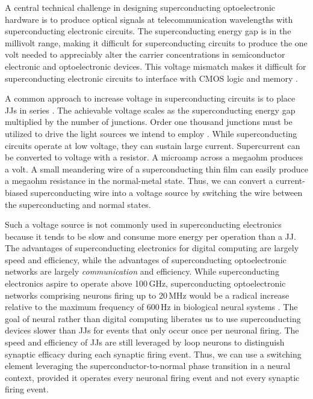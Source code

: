 \documentclass[twocolumn]{article}
\begin{document}
A central technical challenge in designing superconducting optoelectronic hardware is to produce optical signals at telecommunication wavelengths with superconducting electronic circuits. The superconducting energy gap \cite{ti1996} is in the millivolt range, making it difficult for superconducting circuits to produce the one volt needed to appreciably alter the carrier concentrations in semiconductor electronic and optoelectronic devices. This voltage mismatch makes it difficult for superconducting electronic circuits to interface with CMOS logic \cite{ka1999} and memory \cite{vafe2002}. 

A common approach to increase voltage in superconducting circuits is to place JJs in series \cite{suin1988}. The achievable voltage scales as the superconducting energy gap multiplied by the number of junctions. Order one thousand junctions must be utilized to drive the light sources we intend to employ \cite{shbu2017,buch2017,bu2018}. While superconducting circuits operate at low voltage, they can sustain large current. Supercurrent can be converted to voltage with a resistor. A microamp across a megaohm produces a volt. A small meandering wire of a superconducting thin film can easily produce a megaohm resistance in the normal-metal state. Thus, we can convert a current-biased superconducting wire into a voltage source by switching the wire between the superconducting and normal states.

Such a voltage source is not commonly used in superconducting electronics because it tends to be slow and consume more energy per operation than a JJ. The advantages of superconducting electronics for digital computing are largely speed and efficiency, while the advantages of superconducting optoelectronic networks are largely \textit{communication} and efficiency. While superconducting electronics aspire to operate above 100\,GHz, superconducting optoelectronic networks comprising neurons firing up to 20\,MHz would be a radical increase relative to the maximum frequency of 600\,Hz in biological neural systems \cite{stsa2000,budr2004,bu2006}. The goal of neural rather than digital computing liberates us to use superconducting devices slower than JJs for events that only occur once per neuronal firing. The speed and efficiency of JJs are still leveraged by loop neurons to distinguish synaptic efficacy during each synaptic firing event. Thus, we can use a switching element leveraging the superconductor-to-normal phase transition in a neural context, provided it operates every neuronal firing event and not every synaptic firing event. 
\end{document}
